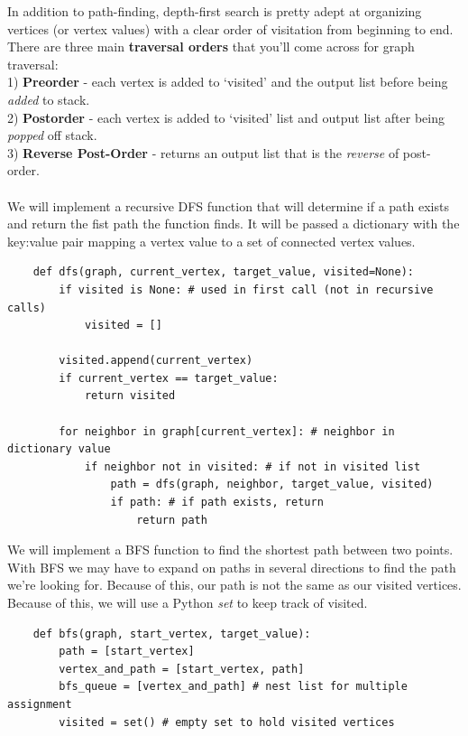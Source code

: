 \documentclass[11pt, a4paper]{article}
\begin{document}
\begin{spacing}{1.1}
	In addition to path-finding, depth-first search is pretty adept at organizing vertices (or vertex values) with a clear order of visitation from beginning to end. There are three main \textbf{traversal orders} that you’ll come across for graph traversal: \\
	\hspace*{3mm} 1) \textbf{Preorder} - each vertex is added to `visited' and the output list before being \textit{added} to stack. \\
	\hspace*{3mm} 2) \textbf{Postorder} - each vertex is added to `visited' list and output list after being \textit{popped} off stack. \\
	\hspace*{3mm} 3) \textbf{Reverse Post-Order} - returns an output list that is the \textit{reverse} of post-order. \\~\\
	We will implement a recursive DFS function that will determine if a path exists and return the fist path the function finds. It will be passed a dictionary with the key:value pair mapping a vertex value to a set of connected vertex values.
	\begin{lstlisting}
	def dfs(graph, current_vertex, target_value, visited=None):
		if visited is None: # used in first call (not in recursive calls)
			visited = [] 
		
		visited.append(current_vertex)
		if current_vertex == target_value:
			return visited
		
		for neighbor in graph[current_vertex]: # neighbor in dictionary value
			if neighbor not in visited: # if not in visited list
				path = dfs(graph, neighbor, target_value, visited)
				if path: # if path exists, return
					return path	\end{lstlisting} \newpage

	\noindent We will implement a BFS function to find the shortest path between two points. With BFS we may have to expand on paths in several directions to find the path we’re looking for. Because of this, our path is not the same as our visited vertices. Because of this, we will use a Python \textit{set} to keep track of visited. 
	\begin{lstlisting}
	def bfs(graph, start_vertex, target_value):
		path = [start_vertex]
		vertex_and_path = [start_vertex, path]
		bfs_queue = [vertex_and_path] # nest list for multiple assignment
		visited = set() # empty set to hold visited vertices
		

\end{lstlisting}
\end{spacing}
\end{document}
